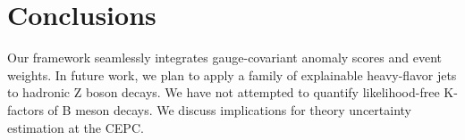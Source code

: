 \section{Conclusions}\label{sec:conclusions}

Our framework seamlessly integrates gauge-covariant anomaly scores and
event weights. In future work, we plan to apply a family of explainable
heavy-flavor jets to hadronic Z boson decays. We have not attempted to
quantify likelihood-free K-factors of B meson decays. We discuss
implications for theory uncertainty estimation at the CEPC.

